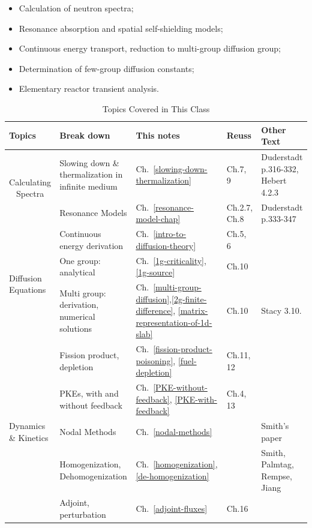 \documentclass{school-22.211-notes}
\date{February  8, 2012}
\begin{document}
\maketitle

\begin{itemize}
  \item Calculation of neutron spectra;
  \item Resonance absorption and spatial self-shielding models;
  \item Continuous energy transport, reduction to multi-group diffusion group;
  \item Determination of few-group diffusion constants;
  \item Elementary reactor transient analysis.
\end{itemize}

\begin{table}[ht]
  \centering
  \begin{tabular}{|p{1in}|p{2in}|p{0.65in}|p{0.6in}|p{1.5in}|} \hline
    Topics & Break down  & This notes & Reuss & Other Text \\ \hline
    \multicolumn{1}{|c|}{\multirow{2}{*}{Calculating Spectra}} & Slowing down \& thermalization in infinite medium   & Ch.~\ref{slowing-down-thermalization} & Ch.7, 9  & Duderstadt p.316-332, Hebert 4.2.3 \\ 
    & Resonance Models & Ch.~\ref{resonance-model-chap} & Ch.2.7, Ch.8 & Duderstadt p.333-347 \\ \hline
    \multirow{3}{*}{Diffusion Equations} & Continuous energy derivation & Ch.~\ref{intro-to-diffusion-theory} & Ch.5, 6 & \\ 
    & One group: analytical & Ch.~\ref{1g-criticality}, \ref{1g-source} & Ch.10  &  \\ 
    & Multi group: derivation, numerical solutions & Ch.~\ref{multi-group-diffusion},\ref{2g-finite-difference}, \ref{matrix-representation-of-1d-slab} & Ch.10  &  Stacy 3.10. \\ \hline
   \multirow{5}{*}{Dynamics \& Kinetics} & Fission product, depletion & Ch.~\ref{fission-product-poisoning}, \ref{fuel-depletion} & Ch.11, 12 &  \\
    & PKEs, with and without feedback & Ch.~\ref{PKE-without-feedback}, \ref{PKE-with-feedback}  & Ch.4, 13 & \\
    & Nodal Methods  & Ch.~\ref{nodal-methods}  &  & Smith's paper \\
    & Homogenization, Dehomogenization & Ch.~\ref{homogenization}, \ref{de-homogenization}  &  &Smith, Palmtag, Rempse, Jiang \\
    & Adjoint, perturbation & Ch.~\ref{adjoint-fluxes} & Ch.16 & \\ \hline 
  \end{tabular}
  \caption{Topics Covered in This Class}
\end{table}
\end{document}
